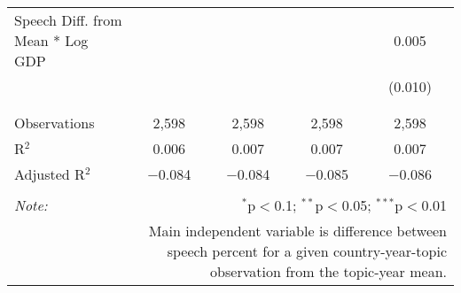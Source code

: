 \begin{table}[!htbp]
\begin{tabular}{@{\extracolsep{5pt}}lcccc}
 Speech Diff. from Mean * Log GDP &  &  &  & 0.005 \\ 
  &  &  &  & (0.010) \\ 
  & & & & \\ 
\hline \\[-1.8ex] 
Observations & 2,598 & 2,598 & 2,598 & 2,598 \\ 
R$^{2}$ & 0.006 & 0.007 & 0.007 & 0.007 \\ 
Adjusted R$^{2}$ & $-$0.084 & $-$0.084 & $-$0.085 & $-$0.086 \\ 
\hline 
\hline \\[-1.8ex] 
\textit{Note:}  & \multicolumn{4}{r}{$^{*}$p$<$0.1; $^{**}$p$<$0.05; $^{***}$p$<$0.01} \\ 
 & \multicolumn{4}{r}{Main independent variable is difference between speech percent for a given country-year-topic observation from the topic-year mean.} \\ 
\end{tabular} 
\end{table} 
